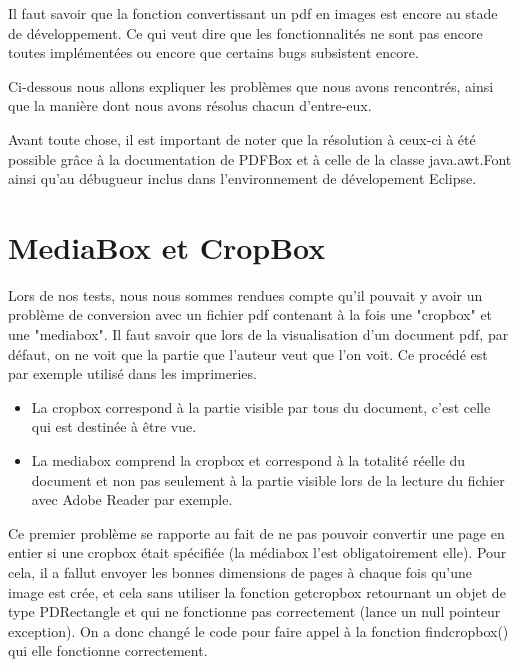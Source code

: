 		Il faut savoir que la fonction convertissant un pdf en images est encore
    au stade de développement. Ce qui veut dire que  les fonctionnalités ne sont 
    pas encore toutes implémentées ou encore que certains bugs subsistent encore.

        Ci-dessous nous allons expliquer les problèmes que nous avons rencontrés,
    ainsi que la manière dont nous avons résolus chacun d'entre-eux.

        Avant toute chose, il est important de noter que la résolution à ceux-ci
    à été possible grâce à la documentation de PDFBox et à celle de la classe 
    java.awt.Font ainsi qu'au débugueur inclus dans l'environnement de dévelopement 
    Eclipse.


	\section{MediaBox et CropBox}
        Lors de nos tests, nous nous sommes rendues compte qu'il pouvait y 
    avoir un problème de conversion avec un fichier pdf contenant à la fois une 
    "cropbox" et une "mediabox". Il faut savoir que lors de la visualisation d'un 
    document pdf, par défaut, on ne voit que la partie que l'auteur veut que l'on 
    voit. Ce procédé est par exemple utilisé dans les imprimeries. 

		\begin{itemize}
			\item La cropbox correspond  à la partie visible par tous du document, 
                  c'est celle qui est destinée à être vue.
			\item La mediabox comprend la cropbox et correspond à la totalité 
                  réelle du document et non pas seulement à la partie visible 
                  lors de la lecture du fichier avec Adobe Reader par exemple. 
		\end{itemize}

    
	        Ce premier problème se rapporte au fait de ne pas pouvoir convertir
        une page en entier si une cropbox était spécifiée (la médiabox l'est 
        obligatoirement elle). Pour cela, il a fallut envoyer les bonnes dimensions 
        de pages à chaque fois qu'une image est crée, et cela sans utiliser la fonction
        getcropbox retournant un objet de type PDRectangle et qui ne fonctionne 
        pas correctement (lance un null pointeur exception). On a donc changé le
        code pour faire appel à la fonction findcropbox() qui elle fonctionne 
        correctement.


